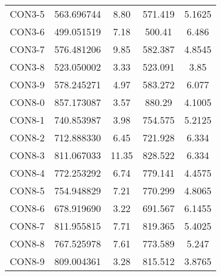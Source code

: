 \begin{table}[ht]
\begin{tabular}{c c c c c}
CON3-5 & 563.696744 & 8.80 & 571.419 & 5.1625 \\
CON3-6 & 499.051519 & 7.18 & 500.41 & 6.486 \\
CON3-7 & 576.481206 & 9.85 & 582.387 & 4.8545 \\
CON3-8 & 523.050002 & 3.33 & 523.091 & 3.85 \\
CON3-9 & 578.245271 & 4.97 & 583.272 & 6.077 \\
CON8-0 & 857.173087 & 3.57 & 880.29 & 4.1005 \\
CON8-1 & 740.853987 & 3.98 & 754.575 & 5.2125 \\
CON8-2 & 712.888330 & 6.45 & 721.928 & 6.334 \\
CON8-3 & 811.067033 & 11.35 & 828.522 & 6.334 \\
CON8-4 & 772.253292 & 6.74 & 779.141 & 4.4575 \\
CON8-5 & 754.948829 & 7.21 & 770.299 & 4.8065 \\
CON8-6 & 678.919690 & 3.22 & 691.567 & 6.1455 \\
CON8-7 & 811.955815 & 7.71 & 819.365 & 5.4025 \\
CON8-8 & 767.525978 & 7.61 & 773.589 & 5.247 \\
CON8-9 & 809.004361 & 3.28 & 815.512 & 3.8765 \\
[1ex]\hline
\end{tabular}
\label{table:nonlin}
\end{table} \clearpage
